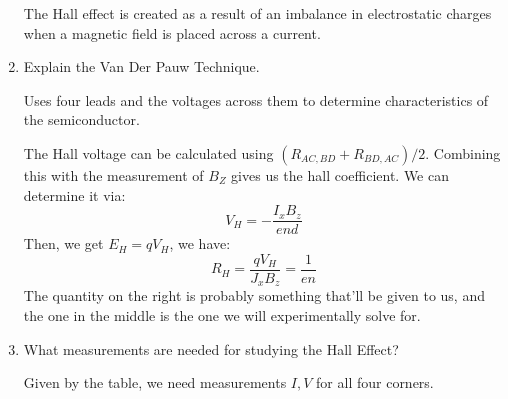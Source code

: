 \documentclass[10pt]{article}
\begin{document}
\begin{enumerate}[label=\arabic*.]
			\begin{solution}
				The Hall effect is created as a result of an imbalance in
				electrostatic charges when a magnetic field is placed across a
				current.   
			\end{solution}
		\item Explain the Van Der Pauw Technique. 

			\begin{solution}
				Uses four leads and the voltages across them to determine
				characteristics of the semiconductor.  

				The Hall voltage can be calculated using \( (R_{AC, BD} + R_{BD, AC})
				/ 2\). Combining this with the measurement of \( B_Z \) gives us the
				hall coefficient. We can determine it via:
				\[
					V_H = -\frac{I_x B_z}{end}
				\]
				Then, we get \( E_H = q V_H \), we have:
				\[
					R_H = \frac{qV_H}{J_x B_z} = \frac{1}{en}
				\]
				The quantity on the right is probably something that'll be given to
				us, and the one in the middle is the one we will experimentally solve
				for. 
			\end{solution}
		\item What measurements are needed for studying the Hall Effect? 

			\begin{solution}
				Given by the table, we need measurements \( I, V \) for all four
				corners. 
			\end{solution}
	\end{enumerate}
\end{document}

